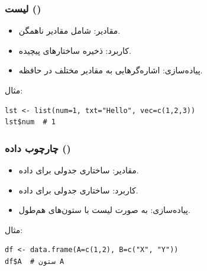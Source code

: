 \documentclass[11pt, a4paper, oneside]{book}
\begin{document}
				
				
				\subsubsection{لیست ()}
				
					\begin{itemize}
						
						\item {\large مقادیر}:
						{\normalsize  شامل مقادیر ناهمگن.}
						
						\item {\large کاربرد}:
						{\normalsize ذخیره ساختارهای پیچیده.}
						
						\item {\large پیاده‌سازی}:
						{\normalsize اشاره‌گرهایی به مقادیر مختلف در حافظه.}
						
					\end{itemize}
					
					مثال:
					
					\begin{latin}
						\begin{lstlisting}[caption={\lr{List data type}}] 
lst <- list(num=1, txt="Hello", vec=c(1,2,3))
lst$num  # 1

						\end{lstlisting}
					\end{latin}
				
				\subsubsection{چارچوب داده ()}
				
					\begin{itemize}
						
						\item {\large مقادیر}:
						{\normalsize  ساختاری جدولی برای داده.}
						
						\item {\large کاربرد}:
						{\normalsize ساختاری جدولی برای داده.}
						
						\item {\large پیاده‌سازی}:
						{\normalsize به صورت لیست با ستون‌های هم‌طول.}
						
					\end{itemize}
					
					مثال:
					
					\begin{latin}
						\begin{lstlisting}[caption={\lr{Data Frame data type}}] 
df <- data.frame(A=c(1,2), B=c("X", "Y"))
df$A  # ستون A

						\end{lstlisting}
					\end{latin}
				
\end{document}
